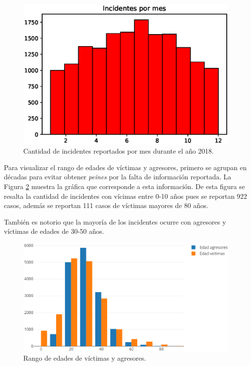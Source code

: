 \documentclass[final,5p,times]{elsarticle}
\begin{document}
\begin{figure}
\centering
\includegraphics[scale=0.6]{mes.eps}
\caption{Cantidad de incidentes reportados por mes durante el a\~no 2018.}
\label{indicentes_mes}
\end{figure} 

Para visualizar el rango de edades de v\'ictimas y agresores, primero se agrupan en d\'ecadas para evitar obtener \textit{peines} por la falta de informaci\'on reportada. La Figura \ref{edades} muestra la gr\'afica que corresponde a esta informaci\'on. De esta figura se resalta la cantidad de incidentes con v\'icimas entre 0-10 a\~nos pues se reportan 922 casos, adem\'as se reportan 111 casos de v\'ictimas mayores de 80 a\~nos. 

Tambi\'en es notorio que la mayor\'ia de los incidentes ocurre con agresores y v\'ictimas de edades de 30-50 a\~nos. 
\begin{figure}
\centering
\includegraphics[scale=0.4]{edades.eps}
\caption{Rango de edades de v\'ictimas y agresores.}
\label{edades}
\end{figure} 
\end{document}
